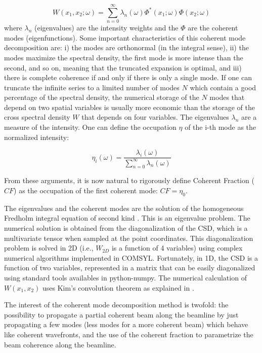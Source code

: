 \documentclass{iucr}              %
\begin{document}
\begin{equation}
W(x_1,x_2;\omega) = \sum_{n=0}^{\infty} \lambda_n(\omega) \Phi^*(x_1;\omega) \Phi(x_2;\omega) 
\label{eq:CMD}
\end{equation}
where $\lambda_n$ (eigenvalues) are the intensity weights and the $\Phi$ are the coherent modes (eigenfunctions). 
Some important characteristics of this coherent mode decomposition are: i) the modes are orthonormal (in the integral sense), ii) the modes maximize the spectral density, the first mode is more intense than the second, and so on, meaning that the truncated expansion is optimal, and iii) there is complete coherence if and only if there is only a single mode. If one can truncate the infinite series to a limited number of modes $N$ which contain a good percentage of the spectral density, the numerical storage of the $N$ modes that depend on two spatial variables is usually more economic than the storage of the cross spectral density $W$ that depends on four variables. 
The eigenvalues $\lambda_n$ are a measure of the intensity. One can define the occupation $\eta$ of the i-th mode as the normalized intensity: 

\begin{equation}
\eta_i(\omega) = \frac{\lambda_i(\omega)}{\sum_{n=0}^{\infty} \lambda_n(\omega)}
\end{equation}

From these arguments, it is now natural to rigorously define Coherent Fraction ($CF$) as the occupation of the first coherent mode: $CF=\eta_0$.

The eigenvalues and the coherent modes are the solution of the homogeneous Fredholm integral equation of second kind \cite{XX}.
This is an eigenvalue problem. The numerical solution is obtained from the diagonalization of the CSD, which is a multivariate tensor when sampled at the point coordinates. This diagonalization problem is solved in 2D (i.e., $W_{2D}$ is a function of 4 variables) using complex numerical algorithms implemented in COMSYL. Fortunately, in 1D, the CSD is a function of two variables, represented in a matrix that can be easily diagonalized using standard tools availables in python-numpy. The numerical calculation of $W(x_1,x_2)$ uses Kim's convolution theorem \cite{XX} as explained in \cite{XX}.

The interest of the coherent mode decomposition method is twofold: the possibility to propagate a partial coherent beam along the beamline by just propagating a few modes (less modes for a more coherent beam) which behave like coherent wavefronts, and the use of the coherent fraction to parametrize the beam coherence along the beamline.  
\end{document}
